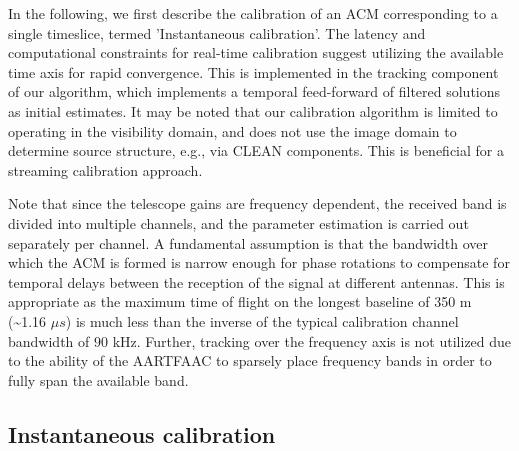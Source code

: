 \documentclass{aa}
\begin{document}
 In the  following,  we first  describe  the calibration  of an  ACM
corresponding to  a single  timeslice, termed 'Instantaneous  calibration'.  The
latency  and   computational  constraints  for   real-time  calibration  suggest
utilizing the available time axis  for rapid convergence. This is implemented in
the  tracking   component  of  our   algorithm,  which  implements   a  temporal
feed-forward of filtered  solutions as initial estimates.  It  may be noted that
our calibration algorithm is limited  to operating in the visibility domain, and
does not  use the image  domain to determine  source structure, e.g.,  via CLEAN
components. This is beneficial for a streaming calibration approach.

Note that since  the telescope gains are frequency  dependent, the received band
is divided into  multiple channels, and the parameter  estimation is carried out
separately per  channel.  A  fundamental assumption is  that the  bandwidth over
which the ACM  is formed is narrow enough for phase  rotations to compensate for
temporal   delays   between  the   reception   of   the   signal  at   different
antennas\citep{zatman1998narrow}.  This  is appropriate  as the maximum  time of
flight on the longest baseline of  350 m (\textasciitilde{}1.16 $\mu s$) is much
less than the inverse of the  typical calibration channel bandwidth of $90$ kHz.
Further, tracking over the frequency axis  is not utilized due to the ability of
the  AARTFAAC to  sparsely place  frequency  bands in  order to  fully span  the
available band.


\subsection{Instantaneous calibration}
\end{document}
